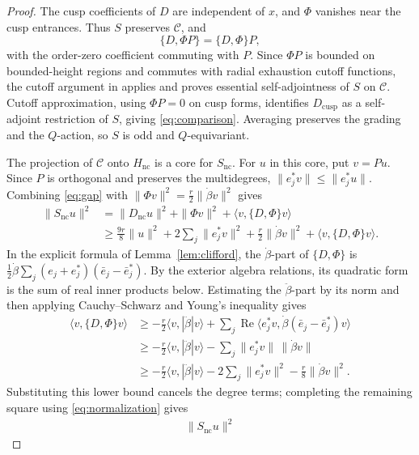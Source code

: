 \documentclass[11pt]{article}
\theoremstyle{definition}
\theoremstyle{plain}
\numberwithin{equation}{section}
\newcommand{\cusp}{\mathrm{cusp}}
\newcommand{\nc}{\mathrm{nc}}
\begin{document}
\begin{proof}
The cusp coefficients of $D$ are independent of $x$, and $\Phi$
vanishes near the cusp entrances. Thus $S$ preserves $\mathcal C$,
and
\[
 \{D,\Phi P\}=\{D,\Phi\}P,
\]
with the order-zero coefficient commuting with $P$.
Since $\Phi P$ is bounded on bounded-height regions and commutes
with radial exhaustion cutoff functions, the cutoff argument
in \cite[\S4]{BravermanCecchini} applies and proves essential
self-adjointness of $S$ on $\mathcal C$.
Cutoff approximation, using $\Phi P=0$ on cusp forms, identifies
$D_{\cusp}$ as a self-adjoint restriction of $S$, giving
\eqref{eq:comparison}. Averaging preserves the grading and the
$Q$-action, so $S$ is odd and $Q$-equivariant.

The projection of $\mathcal C$ onto $H_{\nc}$ is a core for
$S_{\nc}$. For $u$ in this core, put $v=Pu$.
Since $P$ is orthogonal and preserves the multidegrees,
$\|e_j^*v\|\leq\|e_j^*u\|$. Combining \eqref{eq:gap} with
$\|\Phi v\|^2=\tfrac r2\|\dot\beta v\|^2$ gives
\[
 \begin{aligned}
 \|S_{\nc}u\|^2
 &=\|D_{\nc}u\|^2+\|\Phi v\|^2
       +\langle v,\{D,\Phi\}v\rangle\\
 &\geq\frac{9r}{8}\|u\|^2+2\sum_j\|e_j^*v\|^2
       +\frac r2\|\dot\beta v\|^2
       +\langle v,\{D,\Phi\}v\rangle.
 \end{aligned}
\]
In the explicit formula of Lemma~\ref{lem:clifford}, the
$\dot\beta$-part of $\{D,\Phi\}$ is
$\tfrac12\dot\beta\sum_j(e_j+e_j^*)(\bar e_j-\bar e_j^*)$.
By the exterior algebra relations, its quadratic form is the
sum of real inner products below. Estimating the
$\ddot\beta$-part by its norm and then applying Cauchy--Schwarz
and Young's inequality gives
\[
 \begin{aligned}
 \langle v,\{D,\Phi\}v\rangle
 &\geq-\frac r2\langle v,|\ddot\beta|v\rangle
       +\sum_j\operatorname{Re}
          \langle e_j^*v,\dot\beta(\bar e_j-\bar e_j^*)v\rangle\\
 &\geq-\frac r2\langle v,|\ddot\beta|v\rangle
       -\sum_j\|e_j^*v\|\,\|\dot\beta v\|\\
 &\geq-\frac r2\langle v,|\ddot\beta|v\rangle
       -2\sum_j\|e_j^*v\|^2-\frac r8\|\dot\beta v\|^2.
 \end{aligned}
\]
Substituting this lower bound cancels the degree terms; completing
the remaining square using \eqref{eq:normalization} gives
\begin{equation}\label{eq:noncusp-invertibility}
 \begin{aligned}
 \|S_{\nc}u\|^2

\end{aligned}
\end{equation}
\end{proof}
\end{document}
